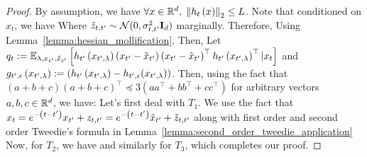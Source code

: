 \begin{proof}
By assumption, we have $\forall x \in \mathbb{R}^{d}, \; \left\lVert h_{t}\left(x\right)\right\rVert_{2} \leq L$. Note that conditioned on $x_{t}$, we have
Where $\tilde{z}_{t,t'} \sim \mathcal{N}(0,\sigma_{t,t'}^2\mathbf{I}_d)$ marginally. Therefore, 
Using Lemma~\ref{lemma:hessian_mollification}, 
Then, 
Let $q_{t} := \mathbb{E}_{\lambda, x_{t'}, \tilde{x}_{t'}}\left[h_{t'}\left(x_{t',\lambda}\right)\left(x_{t'}-\tilde{x}_{t'}\right)\left(x_{t'}-\tilde{x}_{t'}\right)^{\top}h_{t'}\left(x_{t',\lambda}\right)^{\top}|x_{t}\right]$ and $g_{t', \epsilon}\left(x_{t',\lambda}\right) := \left(h_{t'}\left(x_{t',\lambda}\right) - h_{t', \epsilon}(x_{t',\lambda})\right)$. Then, using the fact that $(a+b+c)(a+b+c)^{\top} \preceq 3(aa^{\top} + bb^{\top} + cc^{\top})$ for arbitrary vectors $a,b,c \in \mathbb{R}^d$, we have:
Let's first deal with $T_1$. We use the fact that $x_{t} = e^{-\left(t-t'\right)}x_{t'} + z_{t,t'} = e^{-\left(t-t'\right)}\tilde{x}_{t'} + \tilde{z}_{t,t'}$ along with first order and second order Tweedie's formula in Lemma~\ref{lemma:second_order_tweedie_application}
Now, for $T_{2}$, we have
and similarly for $T_{3}$, 
which completes our proof.
\end{proof} 

